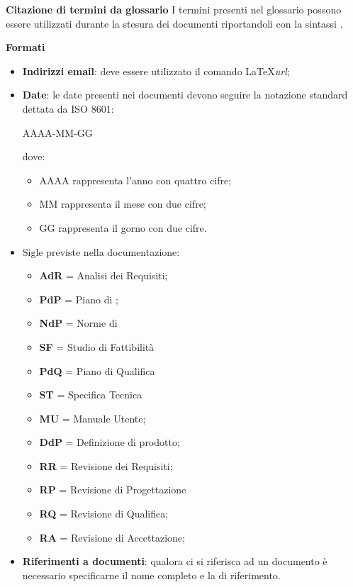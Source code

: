 \textbf{Citazione di termini da glossario}
I termini presenti nel glossario possono essere utilizzati durante la stesura dei documenti riportandoli con la sintassi .


\textbf{Formati} \\
\begin{itemize}
\item \textbf{Indirizzi email}: deve essere utilizzato il comando \LaTeX \textit{url};
\item \textbf{Date}: le date presenti nei documenti devono seguire la notazione standard dettata da ISO 8601:

  \begin{center}
    AAAA-MM-GG
  \end{center}
  
  dove:
  \begin{itemize}
  \item AAAA rappresenta l'anno con quattro cifre;
  \item MM rappresenta il mese con due cifre;
  \item GG rappresenta il gorno con due cifre.
  \end{itemize}
\item Sigle previste nella documentazione:
  \begin{itemize}
  \item \textbf{AdR} = Analisi dei Requisiti;
  \item \textbf{PdP} = Piano di ;
  \item \textbf{NdP} = Norme di 
  \item \textbf{SF} = Studio di Fattibilità
  \item \textbf{PdQ} = Piano di Qualifica
  \item \textbf{ST} = Specifica Tecnica
  \item \textbf{MU} = Manuale Utente;
  \item \textbf{DdP} = Definizione di prodotto;
  \item \textbf{RR} = Revisione dei Requisiti;
  \item \textbf{RP} = Revisione di Progettazione
  \item \textbf{RQ} = Revisione di Qualifica;
  \item \textbf{RA} = Revisione di Accettazione;
  \end{itemize}
\item \textbf{Riferimenti a documenti}: qualora ci si riferisca ad un documento è necessario specificarne il nome completo e la  di riferimento.
\end{itemize}

